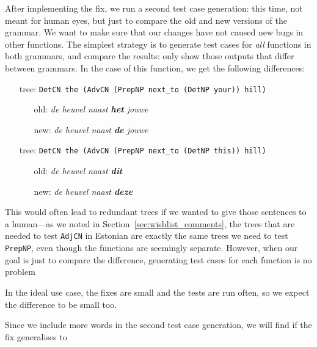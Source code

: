 \documentclass[11pt]{article}
\def\t#1{\texttt{#1}}
\begin{document}
After implementing the fix, we run a second test case generation: this
time, not meant for human eyes, but just to compare the old and new
versions of the grammar. We want to make sure that our changes 
have not caused new bugs in other functions. The simplest strategy is
to generate test cases for \emph{all} functions in both grammars, and
compare the results: only show those outputs that differ between
grammars. In the case of this function, we get the following
differences:

\begin{itemize}
\item[tree:] \t{DetCN the (AdvCN (PrepNP next\_to (DetNP your)) hill)}
  \begin{itemize}
   \item[old:] \emph{de heuvel naast {\bf  het} jouwe}
   \item[new:] \emph{de heuvel naast {\bf  de} jouwe}
  \end{itemize}
\item[tree:] \t{DetCN the (AdvCN (PrepNP next\_to (DetNP this)) hill)}
  \begin{itemize}
   \item[old:]  \emph{de heuvel naast {\bf  dit}}
   \item[new:] \emph{de heuvel naast {\bf  deze}}
  \end{itemize}
\end{itemize}

This would often lead to redundant trees if we
wanted to give those sentences to a human---as we noted in
Section~\ref{sec:wishlist_comments}, the trees that are needed to test
\t{AdjCN} in Estonian are exactly the same trees we need to test
\t{PrepNP}, even though the functions are seemingly separate. However,
when our goal is just to compare the difference, generating test cases
for each function is no problem

In the ideal use case, the fixes are
small and the tests are run often, so we expect the difference to be
small too.

Since we include more words in the second test case generation, we
will find if the fix generalises to 

\end{document}
